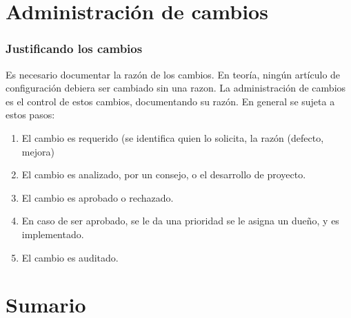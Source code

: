 \section{Administraci\'on de cambios}
\begin{frame}
	\frametitle{Justificando los cambios}
	Es necesario documentar la raz\'on de los cambios. En teor\'ia, ning\'un art\'iculo de configuraci\'on debiera ser 
	cambiado sin una razon. 
	La administraci\'on de cambios es el control de estos cambios, documentando su raz\'on. 
        En general se sujeta a estos pasos: 
	\begin{enumerate}
		\item El cambio es requerido (se identifica quien lo solicita, la raz\'on (defecto, mejora)
		\item El cambio es analizado, por un consejo, o el desarrollo de proyecto.  
		\item El cambio es aprobado o rechazado.
		\item En caso de ser aprobado, se le da una prioridad se le asigna un due\~no, y es implementado. 
		\item El cambio es auditado. 
	\end{enumerate}
\end{frame}

\section{Sumario}
\begin{frame}
\end{frame}
